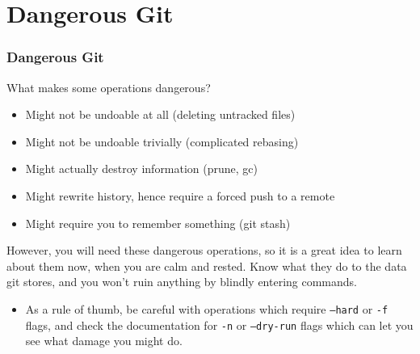 \documentclass{beamer}
\begin{document}
\section{Dangerous Git}

\begin{frame}[fragile]
\frametitle{Dangerous Git}
What makes some operations dangerous?
\begin{itemize}
\item Might not be undoable at all (deleting untracked files)
\item Might not be undoable trivially (complicated rebasing)
\item Might actually destroy information (prune, gc)
\item Might rewrite history, hence require a forced push to a remote
\item Might require you to remember something (git stash)
\end{itemize}
However, you will need these dangerous operations, so it is a great idea to learn about them now, when you are calm and rested. Know what they do to the data git stores, and you won't ruin anything by blindly entering commands.
\begin{itemize}
\item As a rule of thumb, be careful with operations which require \texttt{--hard} or \texttt{-f} flags, and check the documentation for \texttt{-n} or \texttt{--dry-run} flags which can let you see what damage you might do.
\end{itemize}
\end{frame}
\end{document}
